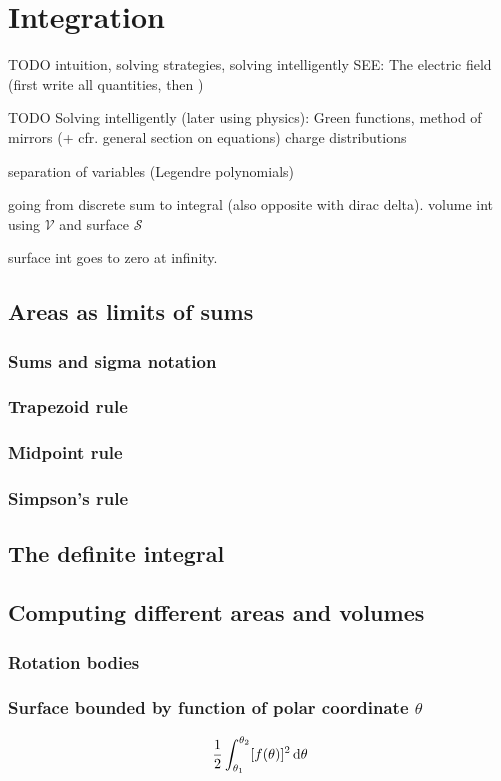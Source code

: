 \section{Integration}
TODO intuition, solving strategies, solving intelligently 
SEE: The electric field (first write all quantities, then )

TODO
Solving intelligently (later using physics): Green functions, method of mirrors (+ cfr. general section on equations)
charge distributions

separation of variables (Legendre polynomials)

going from discrete sum to integral (also opposite with dirac delta). volume int using $\mathcal{V}$ and surface $\mathcal{S}$

surface int goes to zero at infinity.


\subsection{Areas as limits of sums}
\subsubsection{Sums and sigma notation}
\subsubsection{Trapezoid rule}
\subsubsection{Midpoint rule}
\subsubsection{Simpson's rule}

\subsection{The definite integral}
\subsection{Computing different areas and volumes}
\subsubsection{Rotation bodies}
\subsubsection{Surface bounded by function of polar coordinate $\theta$}
\[ \frac{1}{2}\int_{\theta_1}^{\theta_2}[f(\theta)]^2\operatorname{d \!}{\theta} \]

